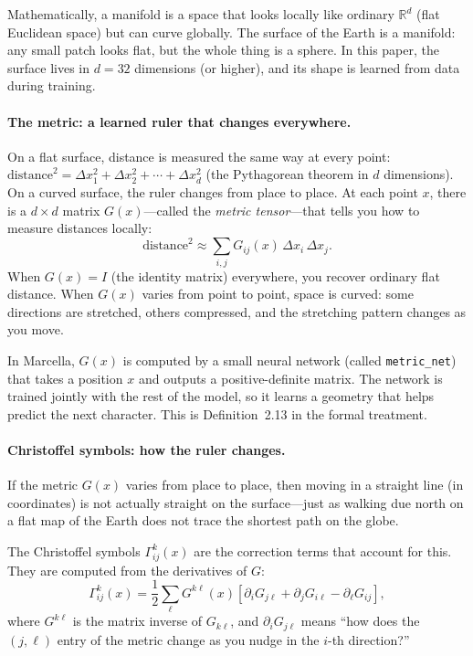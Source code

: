 \documentclass[11pt,a4paper]{article}
\theoremstyle{definition}
\theoremstyle{remark}
\begin{document}
Mathematically, a manifold is a space that looks locally like ordinary $\mathbb{R}^d$ (flat Euclidean space) but can curve globally. The surface of the Earth is a manifold: any small patch looks flat, but the whole thing is a sphere. In this paper, the surface lives in $d = 32$ dimensions (or higher), and its shape is learned from data during training.

\paragraph{The metric: a learned ruler that changes everywhere.}
On a flat surface, distance is measured the same way at every point: $\mathrm{distance}^2 = \Delta x_1^2 + \Delta x_2^2 + \cdots + \Delta x_d^2$ (the Pythagorean theorem in $d$ dimensions). On a curved surface, the ruler changes from place to place. At each point $x$, there is a $d \times d$ matrix $G(x)$---called the \emph{metric tensor}---that tells you how to measure distances locally:
\[
    \mathrm{distance}^2 \approx \sum_{i,j} G_{ij}(x)\,\Delta x_i\,\Delta x_j.
\]
When $G(x) = I$ (the identity matrix) everywhere, you recover ordinary flat distance. When $G(x)$ varies from point to point, space is curved: some directions are stretched, others compressed, and the stretching pattern changes as you move.

In Marcella, $G(x)$ is computed by a small neural network (called \texttt{metric\_net}) that takes a position $x$ and outputs a positive-definite matrix. The network is trained jointly with the rest of the model, so it learns a geometry that helps predict the next character. This is Definition~2.13 in the formal treatment.

\paragraph{Christoffel symbols: how the ruler changes.}
If the metric $G(x)$ varies from place to place, then moving in a straight line (in coordinates) is not actually straight on the surface---just as walking due north on a flat map of the Earth does not trace the shortest path on the globe.

The Christoffel symbols $\Gamma^k_{ij}(x)$ are the correction terms that account for this. They are computed from the derivatives of $G$:
\[
    \Gamma^k_{ij}(x) = \frac{1}{2}\sum_\ell G^{k\ell}(x)\left[\partial_i G_{j\ell} + \partial_j G_{i\ell} - \partial_\ell G_{ij}\right],
\]
where $G^{k\ell}$ is the matrix inverse of $G_{k\ell}$, and $\partial_i G_{j\ell}$ means ``how does the $(j,\ell)$ entry of the metric change as you nudge in the $i$-th direction?''
\end{document}
